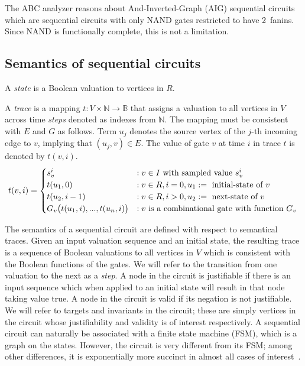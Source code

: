 The ABC analyzer reasons about And-Inverted-Graph (AIG)
sequential circuits which are
sequential circuits with only NAND gates restricted to have 2~fanins.
Since NAND is functionally complete, this is not a limitation.  

\subsection{Semantics of sequential circuits}
\label{s:back:crct_semantics}

\begin{definition}[State]
\rm A {\em state} is a Boolean valuation to vertices in $R$. 
\end{definition}

\begin{definition}[Trace]
\rm A {\em trace} is a mapping $t: V \times \mathbb{N} \rightarrow
\mathbb{B}$ that assigns a valuation to all vertices in
$V$ across time {\em steps} denoted as indexes from
$\mathbb{N}$.  The mapping must be consistent with $E$ and
$G$ as follows.  Term $u_{j}$ denotes the source vertex of
the $j$-th incoming edge to $v$, implying that
$(u_{j},v)\in E$.  The value of gate $v$ at time $i$ in
trace $t$ is denoted by $t(v,i)$.
\[
t(v,i)=
   \begin{cases}
      s^i_{v}            &:v \in I \ \text{with sampled value $s_{v}^i$}\\
      t(u_1, 0)       &:v \in R,i=0,u_1:=\ \text{initial-state of $v$}\\
      t(u_2, i-1)        &:v \in R,i>0,u_2:=\ \text{next-state of $v$}\\
      G_v\big(t(u_{1},i),...,t(u_{n},i)\big) &: v \ \text{is a combinational gate with function 
$G_v$}
   \end{cases} \\
\]
\end{definition}

The semantics of a sequential circuit are defined with
respect to semantical traces.  Given an input valuation
sequence and an initial state, the resulting trace is a
sequence of Boolean valuations to all vertices in $V$
which is consistent with the Boolean functions of the
gates.  We will refer to the transition from one valuation
to the next as a {\em step}.  A node in the circuit is
justifiable if there is an input sequence which when
applied to an initial state will result in that node
taking value $\mbox{true}$.  A node in the circuit is
valid if its negation is not justifiable.  We will refer
to targets and invariants in the circuit; these are simply
vertices in the circuit whose justifiability and validity
is of interest respectively.
A sequential circuit can naturally
be associated with a finite state machine (FSM),
which is a graph on the states.  However, the 
circuit is very different from its FSM; among
other differences, it is exponentially more succinct in
almost all cases of interest~\cite{BuClMcDiHw92}. 


